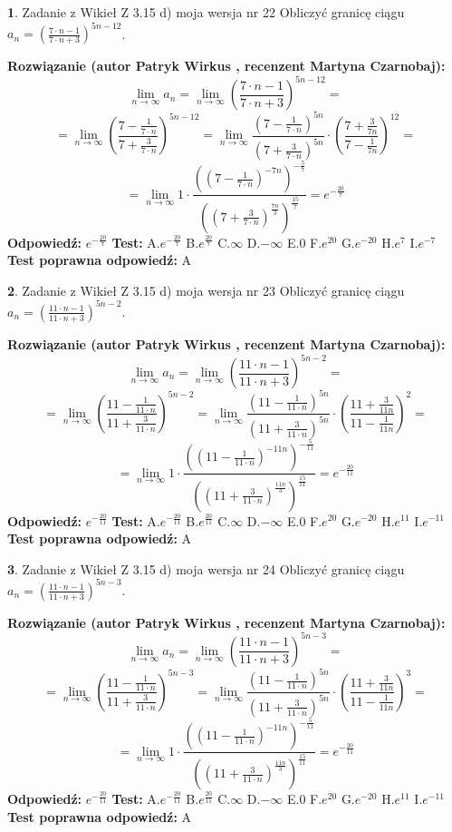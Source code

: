 \documentclass[12pt, a4paper]{article}
\theoremstyle{definition} %
\newtheorem{zad}{}
\newcommand{\zadStart}[1]{\begin{zad}#1\newline}
\newcommand{\zadStop}{\end{zad}}
\newcommand{\rozwStart}[2]{\noindent \textbf{Rozwiązanie (autor #1 , recenzent #2): }\newline}
\newcommand{\rozwStop}{\newline}
\newcommand{\odpStart}{\noindent \textbf{Odpowiedź:}\newline}
\newcommand{\odpStop}{\newline}
\newcommand{\testStart}{\noindent \textbf{Test:}\newline}
\newcommand{\testStop}{\newline}
\newcommand{\kluczStart}{\noindent \textbf{Test poprawna odpowiedź:}\newline}
\newcommand{\kluczStop}{\newline}
\begin{document}
\zadStart{Zadanie z Wikieł Z 3.15 d) moja wersja nr 22}
Obliczyć granicę ciągu $a_{n}=(\frac{7\cdot n - 1}{7 \cdot n + 3})^{5n-12}$.
\zadStop
\rozwStart{Patryk Wirkus}{Martyna Czarnobaj}
$$\lim\limits_{n\to\infty} a_{n} = \lim\limits_{n\to\infty}(\frac{7\cdot n - 1}{7 \cdot n + 3})^{5n-12}=$$
$$=\lim\limits_{n\to\infty}(\frac{7 - \frac{1}{7\cdot n}}{7 + \frac{3}{7 \cdot n}})^{5n-12}=\lim\limits_{n\to\infty}\frac{(7 - \frac{1}{7\cdot n})^{5n}}{(7 + \frac{3}{7\cdot n})^{5n}} \cdot (\frac{7+\frac{3}{7n}}{7-\frac{1}{7n}})^{12}=$$
$$=\lim\limits_{n\to\infty} 1 \cdot \frac{((7-\frac{1}{7 \cdot n})^{-7n})^{-\frac{5}{7}}}{((7+\frac{3}{7 \cdot n})^{\frac{7n}{3}})^{\frac{15}{7}}} =e^{-\frac{20}{7}}$$
\rozwStop
\odpStart
$e^{-\frac{20}{7}}$
\odpStop
\testStart
A.$ e^{-\frac{20}{7}}$
B.$ e^{\frac{20}{7}}$
C.$\infty$
D.$-\infty$
E.$0$
F.$e^{20}$
G.$e^{-20}$
H.$e^{7}$
I.$e^{-7}$
\testStop
\kluczStart
A
\kluczStop



\zadStart{Zadanie z Wikieł Z 3.15 d) moja wersja nr 23}
Obliczyć granicę ciągu $a_{n}=(\frac{11\cdot n - 1}{11 \cdot n + 3})^{5n-2}$.
\zadStop
\rozwStart{Patryk Wirkus}{Martyna Czarnobaj}
$$\lim\limits_{n\to\infty} a_{n} = \lim\limits_{n\to\infty}(\frac{11\cdot n - 1}{11 \cdot n + 3})^{5n-2}=$$
$$=\lim\limits_{n\to\infty}(\frac{11 - \frac{1}{11\cdot n}}{11 + \frac{3}{11 \cdot n}})^{5n-2}=\lim\limits_{n\to\infty}\frac{(11 - \frac{1}{11\cdot n})^{5n}}{(11 + \frac{3}{11\cdot n})^{5n}} \cdot (\frac{11+\frac{3}{11n}}{11-\frac{1}{11n}})^{2}=$$
$$=\lim\limits_{n\to\infty} 1 \cdot \frac{((11-\frac{1}{11 \cdot n})^{-11n})^{-\frac{5}{11}}}{((11+\frac{3}{11 \cdot n})^{\frac{11n}{3}})^{\frac{15}{11}}} =e^{-\frac{20}{11}}$$
\rozwStop
\odpStart
$e^{-\frac{20}{11}}$
\odpStop
\testStart
A.$ e^{-\frac{20}{11}}$
B.$ e^{\frac{20}{11}}$
C.$\infty$
D.$-\infty$
E.$0$
F.$e^{20}$
G.$e^{-20}$
H.$e^{11}$
I.$e^{-11}$
\testStop
\kluczStart
A
\kluczStop



\zadStart{Zadanie z Wikieł Z 3.15 d) moja wersja nr 24}
Obliczyć granicę ciągu $a_{n}=(\frac{11\cdot n - 1}{11 \cdot n + 3})^{5n-3}$.
\zadStop
\rozwStart{Patryk Wirkus}{Martyna Czarnobaj}
$$\lim\limits_{n\to\infty} a_{n} = \lim\limits_{n\to\infty}(\frac{11\cdot n - 1}{11 \cdot n + 3})^{5n-3}=$$
$$=\lim\limits_{n\to\infty}(\frac{11 - \frac{1}{11\cdot n}}{11 + \frac{3}{11 \cdot n}})^{5n-3}=\lim\limits_{n\to\infty}\frac{(11 - \frac{1}{11\cdot n})^{5n}}{(11 + \frac{3}{11\cdot n})^{5n}} \cdot (\frac{11+\frac{3}{11n}}{11-\frac{1}{11n}})^{3}=$$
$$=\lim\limits_{n\to\infty} 1 \cdot \frac{((11-\frac{1}{11 \cdot n})^{-11n})^{-\frac{5}{11}}}{((11+\frac{3}{11 \cdot n})^{\frac{11n}{3}})^{\frac{15}{11}}} =e^{-\frac{20}{11}}$$
\rozwStop
\odpStart
$e^{-\frac{20}{11}}$
\odpStop
\testStart
A.$ e^{-\frac{20}{11}}$
B.$ e^{\frac{20}{11}}$
C.$\infty$
D.$-\infty$
E.$0$
F.$e^{20}$
G.$e^{-20}$
H.$e^{11}$
I.$e^{-11}$
\testStop
\kluczStart
A
\kluczStop
\end{document}
